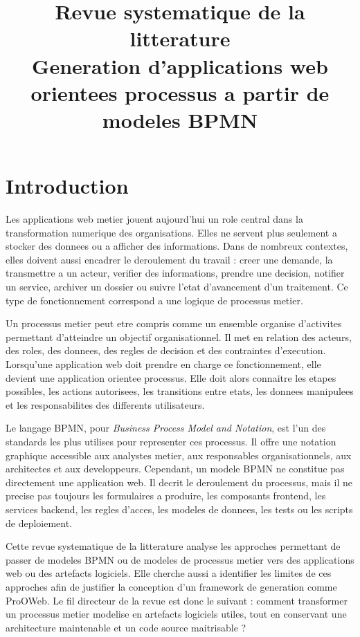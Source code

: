 \documentclass[12pt,a4paper]{article}
\title{Revue systematique de la litterature\\
\large Generation d'applications web orientees processus a partir de modeles BPMN}
\author{}
\date{}
\begin{document}
\maketitle

\section{Introduction}

Les applications web metier jouent aujourd'hui un role central dans la transformation numerique des organisations. Elles ne servent plus seulement a stocker des donnees ou a afficher des informations. Dans de nombreux contextes, elles doivent aussi encadrer le deroulement du travail : creer une demande, la transmettre a un acteur, verifier des informations, prendre une decision, notifier un service, archiver un dossier ou suivre l'etat d'avancement d'un traitement. Ce type de fonctionnement correspond a une logique de processus metier.

Un processus metier peut etre compris comme un ensemble organise d'activites permettant d'atteindre un objectif organisationnel. Il met en relation des acteurs, des roles, des donnees, des regles de decision et des contraintes d'execution. Lorsqu'une application web doit prendre en charge ce fonctionnement, elle devient une application orientee processus. Elle doit alors connaitre les etapes possibles, les actions autorisees, les transitions entre etats, les donnees manipulees et les responsabilites des differents utilisateurs.

Le langage BPMN, pour \textit{Business Process Model and Notation}, est l'un des standards les plus utilises pour representer ces processus. Il offre une notation graphique accessible aux analystes metier, aux responsables organisationnels, aux architectes et aux developpeurs. Cependant, un modele BPMN ne constitue pas directement une application web. Il decrit le deroulement du processus, mais il ne precise pas toujours les formulaires a produire, les composants frontend, les services backend, les regles d'acces, les modeles de donnees, les tests ou les scripts de deploiement.

Cette revue systematique de la litterature analyse les approches permettant de passer de modeles BPMN ou de modeles de processus metier vers des applications web ou des artefacts logiciels. Elle cherche aussi a identifier les limites de ces approches afin de justifier la conception d'un framework de generation comme ProOWeb. Le fil directeur de la revue est donc le suivant : comment transformer un processus metier modelise en artefacts logiciels utiles, tout en conservant une architecture maintenable et un code source maitrisable ?
\end{document}
